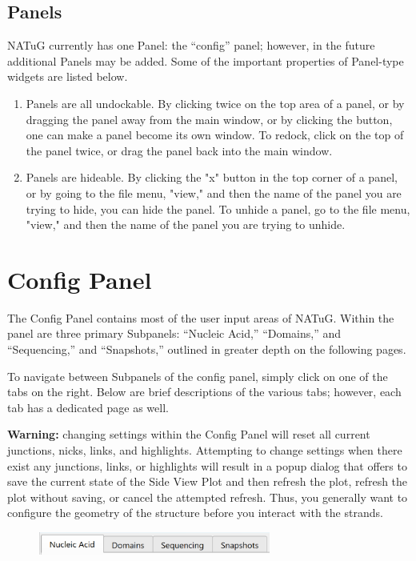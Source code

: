 \documentclass[titlepage]{article}
\begin{document}
\subsection{Panels}
NATuG currently has one Panel: the ``config'' panel; however, in the future additional Panels may be added. Some of the important properties of Panel-type widgets are listed below.

\begin{enumerate}
	\item Panels are all undockable. By clicking twice on the top area of a panel, or by dragging the panel away from the main window, or by clicking the  button, one can make a panel become its own window. To redock, click on the top of the panel twice, or drag the panel back into the main window. 
	\item Panels are hideable. By clicking the "x" button in the top corner of a panel, or by going to the file menu, "view," and then the name of the panel you are trying to hide, you can hide the panel. To unhide a panel, go to the file menu, "view," and then the name of the panel you are trying to unhide. 
\end{enumerate}

\section{Config Panel} \label{section:config-panel}	
The Config Panel contains most of the user input areas of NATuG. Within the panel are three primary Subpanels: ``Nucleic Acid,'' ``Domains,'' and ``Sequencing,'' and ``Snapshots,'' outlined in greater depth on the following pages.

To navigate between Subpanels of the config panel, simply click on one of the tabs on the right. Below are brief descriptions of the various tabs; however, each tab has a dedicated page as well.

\textbf{Warning:} changing settings within the Config Panel will reset all current junctions, nicks, links, and highlights. Attempting to change settings when there exist any junctions, links, or highlights will result in a popup dialog that offers to save the current state of the Side View Plot and then refresh the plot, refresh the plot without saving, or cancel the attempted refresh. Thus, you generally want to configure the geometry of the structure before you interact with the strands.

\begin{figure}[h]
	\centering
	\includegraphics[width=3in]{"nucleic-acid-tab-activated.png"}
	\label{fig:nucleic-acid-tab-activated}
\end{figure}
\end{document}
